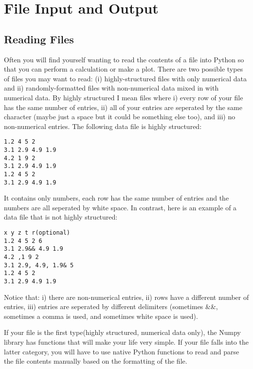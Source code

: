 \chapter{File Input and Output}

\label{chap:fileio}

\section{Reading Files}
Often you will find yourself wanting to read the contents of a file
into Python so that you can perform a calculation or make a plot.
There are two possible types of files you may want to read: (i)
highly-structured files with only numerical data and ii)
randomly-formatted files with non-numerical data mixed in with
numerical data.  By highly structured I mean files where i) every row of your
file has the same number of entries, ii) all of your entries are
seperated by the same character (maybe just a space but it could be
something else too), and iii) no non-numerical entries.  The following
data file is highly structured:
\begin{Verbatim}
1.2 4 5 2
3.1 2.9 4.9 1.9
4.2 1 9 2
3.1 2.9 4.9 1.9
1.2 4 5 2
3.1 2.9 4.9 1.9
\end{Verbatim}
It contains only numbers, each row has the same number of entries and
the numbers are all seperated by white space.  In contrast, here is an
example of a data file that is not highly structured:
\begin{Verbatim}
x y z t r(optional)
1.2 4 5 2 6
3.1 2.9&& 4.9 1.9
4.2 ,1 9 2
3.1 2.9, 4.9, 1.9& 5
1.2 4 5 2
3.1 2.9 4.9 1.9
\end{Verbatim}
Notice that: i) there are non-numerical entries, ii) rows have a
different number of entries, iii) entries are seperated by different
delimiters (sometimes \&\&, sometimes a comma is used, and sometimes
white space is used).

If your file is the first type(highly structured, numerical data
only), the Numpy library has functions that will make your life very
simple.  If your file falls into the latter category, you will have to
use native Python functions to read and parse the file contents manually based
on the formatting of the file.

